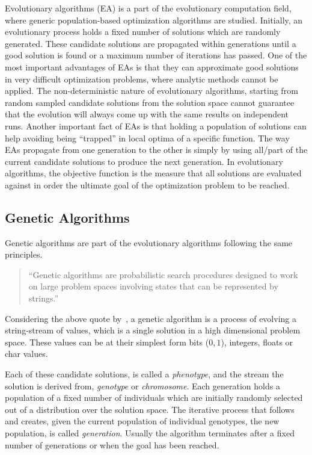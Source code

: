Evolutionary algorithms (EA) is a part of the evolutionary computation field, where generic population-based optimization algorithms are studied. Initially, an evolutionary process holds a fixed number of solutions which are randomly generated. These candidate solutions are propagated within generations until a good solution is found or a maximum number of iterations has passed. One of the most important advantages of EAs is that they can approximate good solutions in very difficult optimization problems, where analytic methods cannot be applied. The non-deterministic nature of evolutionary algorithms, starting from random sampled candidate solutions from the solution space cannot guarantee that the evolution will always come up with the same results on independent runs. Another important fact of EAs is that holding a population of solutions can help avoiding being ``trapped'' in local optima of a specific function. The way EAs propagate from one generation to the other is simply by using all/part of the current candidate solutions to produce the next generation. In evolutionary algorithms, the objective function is the measure that all solutions are evaluated against in order the ultimate goal of the optimization problem to be reached.




\subsection{Genetic Algorithms}
Genetic algorithms are part of the evolutionary algorithms following the same principles.

\begin{quote}``Genetic algorithms are probabilistic search procedures designed to work on
large problem spaces involving states that can be represented by strings.''\end{quote}

Considering the above quote by~\citep{goldberg1988genetic}, a genetic algorithm is a process of evolving a string-stream of values, which is a single solution in a high dimensional problem space. These values can be at their simplest form bits ($0, 1$), integers, floats or char values.

Each of these candidate solutions, is called a \emph{phenotype}, and the stream the solution is derived from, \emph{genotype} or \emph{chromosome}. Each generation holds a population of a fixed number of individuals which are initially randomly selected out of a distribution over the solution space. The iterative process that follows and creates, given the current population of individual genotypes, the new population, is called \emph{generation}. Usually the algorithm terminates after a fixed number of generations or when the goal has been reached. 

